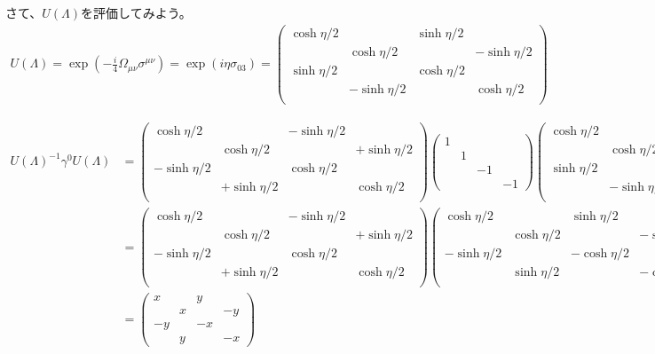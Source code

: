 \documentclass[10pt,a4paper]{jarticle}
\begin{document}
%
さて、$U(\Lambda)$を評価してみよう。
\begin{align}
U(\Lambda)
=
\exp\left( -\frac{i}{4} \Omega_{\mu\nu} \sigma^{\mu\nu} \right)
=
\exp\left( i \eta \sigma_{03} \right)
=
\left(\begin{array}{cccc}
\cosh\eta/2 & & \sinh\eta/2 & \\
& \cosh\eta/2 & & -\sinh\eta/2 \\
\sinh\eta/2 & & \cosh\eta/2 & \\
& -\sinh\eta/2 & & \cosh\eta/2 \\
\end{array}\right)
\end{align}

{\tiny
\begin{align}
U(\Lambda)^{-1} \gamma^0 U(\Lambda)
&=
\left(\begin{array}{cccc}
\cosh\eta/2 & & -\sinh\eta/2 & \\
& \cosh\eta/2 & & +\sinh\eta/2 \\
-\sinh\eta/2 & & \cosh\eta/2 & \\
& +\sinh\eta/2 & & \cosh\eta/2 \\
\end{array}\right)
%
\left(\begin{array}{cccc}
1&&&\\
&1&&\\
&&-1&\\
&&&-1
\end{array}\right)
%
\left(\begin{array}{cccc}
\cosh\eta/2 & & \sinh\eta/2 & \\
& \cosh\eta/2 & & -\sinh\eta/2 \\
\sinh\eta/2 & & \cosh\eta/2 & \\
& -\sinh\eta/2 & & \cosh\eta/2 \\
\end{array}\right) \nonumber\\
%
&=
\left(\begin{array}{cccc}
\cosh\eta/2 & & -\sinh\eta/2 & \\
& \cosh\eta/2 & & +\sinh\eta/2 \\
-\sinh\eta/2 & & \cosh\eta/2 & \\
& +\sinh\eta/2 & & \cosh\eta/2 \\
\end{array}\right)
%
\left(\begin{array}{cccc}
\cosh\eta/2 & & \sinh\eta/2 & \\
& \cosh\eta/2 & & -\sinh\eta/2 \\
-\sinh\eta/2 & & -\cosh\eta/2 & \\
& \sinh\eta/2 & & -\cosh\eta/2 \\
\end{array}\right) \nonumber\\
%
&=
\left(\begin{array}{cccc}
x&&y&\\
&x&&-y\\
-y&&-x&\\
&y&&-x
\end{array}\right) \nonumber\\
\end{align}
}
\end{document}
